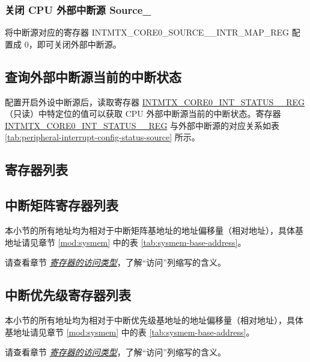 \documentclass[main\_\_CN.tex]{subfiles}
\begin{document}
\subsubsection{关闭 CPU 外部中断源 Source\_}

将中断源对应的寄存器 INTMTX\_CORE0\_SOURCE\_\_INTR\_MAP\_REG 配置成 0，即可关闭外部中断源。



\subsection{查询外部中断源当前的中断状态}

配置开启外设中断源后，读取寄存器 \hyperref[regdesc:INTMTXCORE0INTSTATUS0REG]{INTMTX\_CORE0\_INT\_STATUS\_\_REG}（只读）中特定位的值可以获取 CPU 外部中断源当前的中断状态。寄存器 \hyperref[regdesc:INTMTXCORE0INTSTATUS0REG]{INTMTX\_CORE0\_INT\_STATUS\_\_REG} 与外部中断源的对应关系如表 \ref{tab:peripheral-interrupt-config-status-source} 所示。





\clearpage
\hypertarget{intmtrx-reg-summ}{}

\begin{landscape}
\section{寄存器列表}

\subsection{中断矩阵寄存器列表}
\label{sec:intmtrx-reg-summ}

本小节的所有地址均为相对于中断矩阵基地址的地址偏移量（相对地址），具体基地址请见章节 \ref{mod:sysmem} \textit{} 中的表 \ref{tab:sysmem-base-address}。

请查看章节 \hyperref[glossary-access-types]{\textit{寄存器的访问类型}}，了解“访问”列缩写的含义。




\subsection{中断优先级寄存器列表}
\label{sec:intpri-reg-summ}

本小节的所有地址均为相对于中断优先级基地址的地址偏移量（相对地址），具体基地址请见章节 \ref{mod:sysmem} \textit{} 中的表 \ref{tab:sysmem-base-address}。

请查看章节 \hyperref[glossary-access-types]{\textit{寄存器的访问类型}}，了解“访问”列缩写的含义。




\end{landscape}
\end{document}
